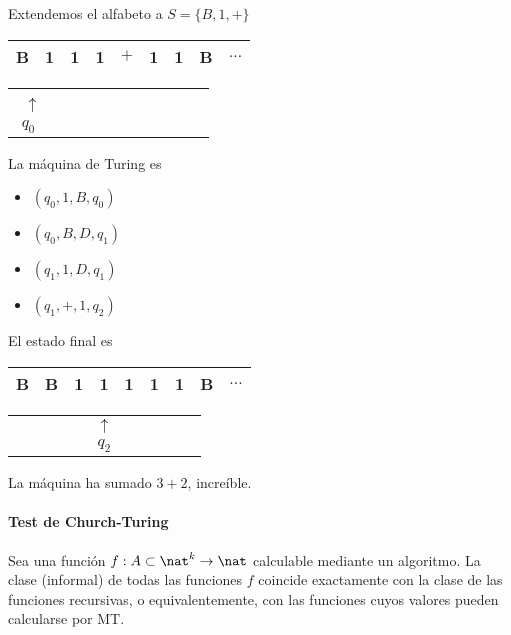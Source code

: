 \begin{example}
	Extendemos el alfabeto a $S=\{B, 1, +\}$
	\begin{center}
		\begin{tabular}{|c|c|c|c|c|c|c|c|c|}
			\hline
			B & 1 & 1 & 1 & $+$ & 1 & 1 & B & $\hdots$\\
			\hline
		\end{tabular}

	\begin{tabular}{c c c c c c c c c c c}
		  \ $\uparrow$ &  &  &  &  &  & &  & &&  \\
		  $q_0$ &  &  &  &  &  &  &  & & &\\
	\end{tabular}
	\end{center}

	La máquina de Turing es
	\begin{itemize}
		\item $(q_0, 1, B, q_0)$
		\item $(q_0, B, D, q_1)$
		\item $(q_1, 1, D, q_1)$
		\item $(q_1, +, 1, q_2)$
	\end{itemize}

	El estado final es
	\begin{center}
		\begin{tabular}{|c|c|c|c|c|c|c|c|c|}
			\hline
			B & B & 1 & 1 & 1 & 1 & 1 & B & $\hdots$\\
			\hline
		\end{tabular}

		\begin{tabular}{c c c c c c c c c c c}
			&  &  &  &  & $\uparrow$ &  & & & & \\
			&  &  &  & &  $q_2$  &  &  & & & \\
		\end{tabular}
	\end{center}

	La máquina ha sumado $3+2$, increíble.
\end{example}

\paragraph{Test de Church-Turing} \mbox{}

Sea una función $f:A\subset\nat^k\to \nat$ calculable mediante un algoritmo. La clase (informal) de todas las funciones $f$ coincide exactamente con la clase de las funciones recursivas, o equivalentemente, con las funciones cuyos valores pueden calcularse por MT.


